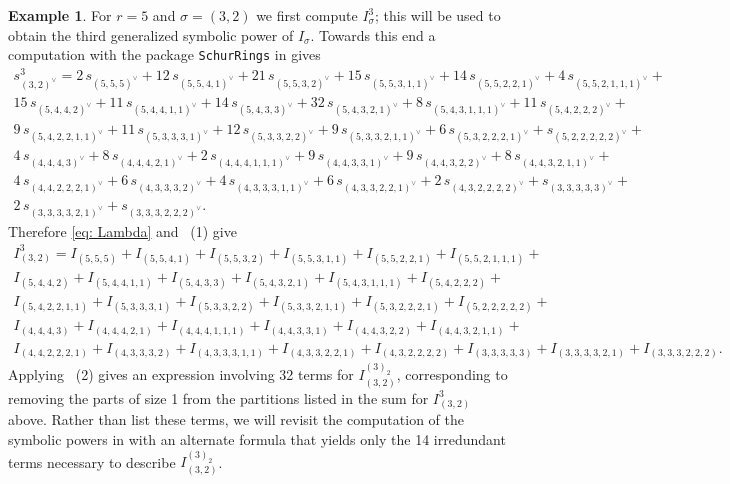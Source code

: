 \documentclass[11pt, reqno]{amsart}
\numberwithin{equation}{section}
\theoremstyle{definition}
\newtheorem{example}[theorem]{Example}
\newcommand{\s}{\sigma}
\begin{document}
	\begin{example}\label{ex: symb 1}
	For $r=5$ and $\s=(3,2)$  we first compute $I_\s^3$; this will be used to obtain the third generalized symbolic power of $I_\s$. Towards this end a computation with the package \texttt{SchurRings} in \cite{M2} gives
	\begin{multline*}
	s_{(3,2)^\vee}^3= 2\,s_{(5,5,5)^\vee}+
			12\,s_{(5,5,4,1)^\vee}+
			21\,s_{(5,5,3,2)^\vee}+
			15\,s_{(5,5,3,1,1)^\vee}+
			14\,s_{(5,5,2,2,1)^\vee}+
			4\,s_{(5,5,2,1,1,1)^\vee}+\\
			15\,s_{(5,4,4,2)^\vee}+
			11\,s_{(5,4,4,1,1)^\vee}+
      			14\,s_{(5,4,3,3)^\vee} +
      			32\,s_{(5,4,3,2,1)^\vee}+
			8\,s_{(5,4,3,1,1,1)^\vee}+
			11\,s_{(5,4,2,2,2)^\vee}+\\
			9\,s_{(5,4,2,2,1,1)^\vee}+
			11\,s_{(5,3,3,3,1)^\vee}+
			12\,s_{(5,3,3,2,2)^\vee}+
			9\,s_{(5,3,3,2,1,1)^\vee}+
      			6\,s_{(5,3,2,2,2,1)^\vee}+
     			s_{(5,2,2,2,2,2)^\vee}+\\
			4\,s_{(4,4,4,3)^\vee}+
			8\,s_{(4,4,4,2,1)^\vee}+
			2\,s_{(4,4,4,1,1,1)^\vee}+
			9\,s_{(4,4,3,3,1)^\vee}+
			9\,s_{(4,4,3,2,2)^\vee}+
			8\,s_{(4,4,3,2,1,1)^\vee}+\\
			4\,s_{(4,4,2,2,2,1)^\vee}+
			6\,s_{(4,3,3,3,2)^\vee}+
			4\,s_{(4,3,3,3,1,1)^\vee}+
			6\,s_{(4,3,3,2,2,1)^\vee}+
			2\,s_{(4,3,2,2,2,2)^\vee}+
			s_{(3,3,3,3,3)^\vee}+\\
			2\,s_{(3,3,3,3,2,1)^\vee}+
			s_{(3,3,3,2,2,2)^\vee}.
       \end{multline*}
      Therefore \eqref{eq: Lambda}  and  ~(1) give 
    \begin{multline*}
    I_{(3,2)}^3= I_{(5,5,5)}+
			 I_{(5,5,4,1)}+
			 I_{(5,5,3,2)}+
			 I_{(5,5,3,1,1)}+
			 I_{(5,5,2,2,1)}+
			 I_{(5,5,2,1,1,1)}+\\
			 I_{(5,4,4,2)}+
			 I_{(5,4,4,1,1)}+
      			 I_{(5,4,3,3)} +
      			 I_{(5,4,3,2,1)}+
			 I_{(5,4,3,1,1,1)}+
			 I_{(5,4,2,2,2)}+\\
			 I_{(5,4,2,2,1,1)}+
			 I_{(5,3,3,3,1)}+
			 I_{(5,3,3,2,2)}+
			 I_{(5,3,3,2,1,1)}+
      			 I_{(5,3,2,2,2,1)}+
     			 I_{(5,2,2,2,2,2)}+\\
			 I_{(4,4,4,3)}+
			 I_{(4,4,4,2,1)}+
			 I_{(4,4,4,1,1,1)}+
			 I_{(4,4,3,3,1)}+
			 I_{(4,4,3,2,2)}+
			 I_{(4,4,3,2,1,1)}+\\
			 I_{(4,4,2,2,2,1)}+
			 I_{(4,3,3,3,2)}+
			 I_{(4,3,3,3,1,1)}+
			 I_{(4,3,3,2,2,1)}+
			 I_{(4,3,2,2,2,2)}+
			 I_{(3,3,3,3,3)}+
			 I_{(3,3,3,3,2,1)}+
			 I_{(3,3,3,2,2,2)}.
\end{multline*}
 Applying ~(2) gives an expression involving  32 terms  for $I_{(3,2)}^{(3)_2}$, corresponding to removing the parts of size 1 from the partitions listed in the sum for  $I_{(3,2)}^3$ above. Rather than list these terms, we will revisit the computation of the symbolic powers in  with an alternate formula that yields only the 14 irredundant terms necessary to describe $I_{(3,2)}^{(3)_2}$.
\end{example}
\end{document}
